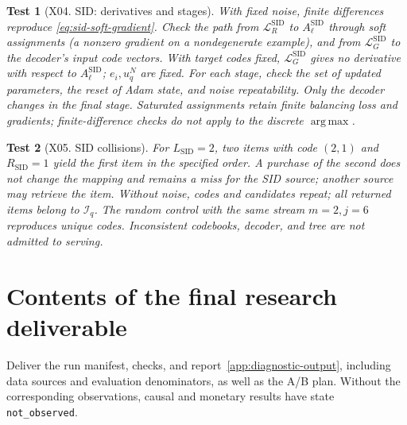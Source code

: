 \documentclass[12pt,a4paper]{article}
\newcommand{\code}[1]{{\ttfamily\small\nolinkurl{#1}}}
\DeclareMathOperator*{\argmax}{arg\,max}
\theoremstyle{plainru}
\newtheorem{testcase}{Test}[section]
\begin{document}
\begin{testcase}[X04. SID: derivatives and stages]
With fixed noise, finite differences reproduce
\eqref{eq:sid-soft-gradient}. Check the path from $\mathcal L_R^{\mathrm{SID}}$
to $A_\ell^{\mathrm{SID}}$ through soft assignments (a nonzero gradient
on a nondegenerate example), and from
$\mathcal L_G^{\mathrm{SID}}$ to the decoder's input code vectors.
With target codes fixed, $\mathcal L_G^{\mathrm{SID}}$ gives no
derivative with respect to $A_\ell^{\mathrm{SID}}$; $e_i,u_q^N$ are fixed.
For each stage, check the set of updated parameters, the reset of Adam
state, and noise repeatability. Only the decoder changes in the final stage.
Saturated assignments retain finite balancing loss and gradients;
finite-difference checks do not apply to the discrete $\argmax$.
\end{testcase}

\begin{testcase}[X05. SID collisions]
For $L_{\mathrm{SID}}=2$, two items with code $(2,1)$
and $R_{\mathrm{SID}}=1$ yield the first item
in the specified order. A purchase of the second does not change the mapping
and remains a miss for the SID source; another source may retrieve the item.
Without noise, codes and candidates repeat; all returned items belong to $\mathcal I_q$.
The random control with the same stream $m=2,j=6$ reproduces unique codes.
Inconsistent codebooks, decoder, and tree are not admitted to serving.
\end{testcase}

\section{Contents of the final research deliverable}\label{app:deliverables}

Deliver the run manifest, checks, and report~\ref{app:diagnostic-output},
including data sources and evaluation denominators, as well as the A/B plan.
Without the corresponding observations, causal and monetary results
have state \code{not_observed}.
\end{document}
